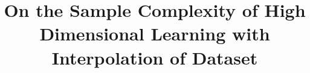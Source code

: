 \documentclass[conference,a4paper]{IEEEtran}
\begin{document}
\title{On the Sample Complexity of High Dimensional Learning with Interpolation of Dataset}

\author{%
}

%
%
%
%
\end{document}
